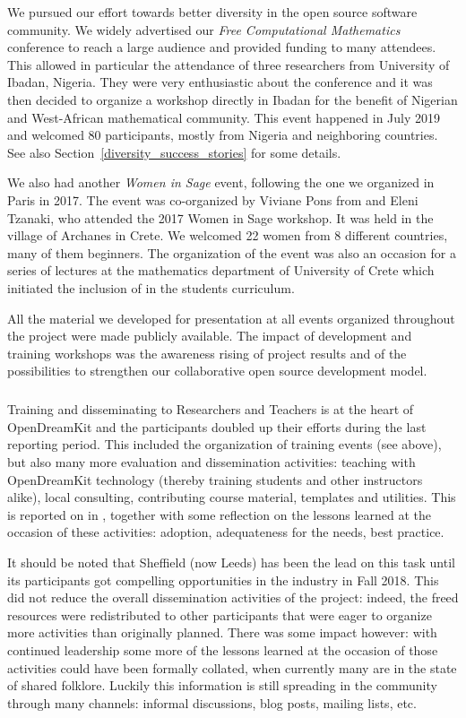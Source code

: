 We pursued our effort towards better diversity in the open source software community. We widely advertised our
  \emph{Free Computational Mathematics} conference to reach a large audience and provided funding to many attendees.
  This allowed in particular the attendance of three researchers from University of Ibadan, Nigeria. They were very enthusiastic
  about the conference and it was then decided to organize a \Sage workshop directly in Ibadan for the benefit of Nigerian and
  West-African mathematical community. This event happened in July 2019 and welcomed 80 participants, mostly from Nigeria and
  neighboring countries.
  See also Section~\ref{diversity_success_stories} for some details.

  We also had another \emph{Women in Sage} event, following the one we organized in Paris in 2017. The event was co-organized
  by Viviane Pons from \ODK and Eleni Tzanaki, who attended the 2017 Women in Sage workshop. It was held in the village of Archanes
  in Crete. We welcomed 22 women from 8 different countries, many of them \Sage beginners. The organization of the event was also
  an occasion for a series of \Sage lectures at the mathematics department of University of Crete which initiated the inclusion of \Sage
  in the students curriculum.


All the material we developed for presentation at all events organized throughout the project were made publicly available. The impact of development and training workshops was the awareness rising of project results and of the possibilities to strengthen our collaborative open source development model.
\smallskip
\subparagraph{}

Training and disseminating to Researchers and Teachers is at the heart
of OpenDreamKit and the participants doubled up their efforts during
the last reporting period. This included the organization of training
events (see  above), but also many
more evaluation and dissemination activities: teaching with
OpenDreamKit technology (thereby training students and other
instructors alike), local consulting, contributing course material,
templates and utilities. This is reported on in
, together with some reflection on the
lessons learned at the occasion of these activities: adoption,
adequateness for the needs, best practice.

It should be noted that Sheffield (now Leeds) has been the lead on
this task until its participants got compelling opportunities in the
industry in Fall 2018. This did not reduce the overall dissemination
activities of the project: indeed, the freed resources were
redistributed to other participants that were eager to organize more
activities than originally planned. There was some impact however:
with continued leadership some more of the lessons learned at the
occasion of those activities could have been formally collated, when
currently many are in the state of shared folklore. Luckily this
information is still spreading in the community through many channels:
informal discussions, blog posts, mailing lists, etc.


